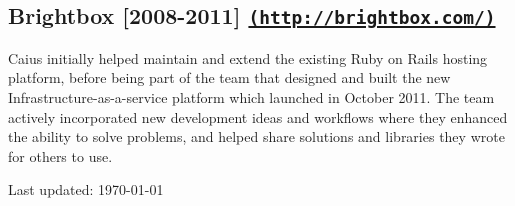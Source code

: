 \documentclass[letterpaper]{article}
\begin{document}

\subsection*{Brightbox [2008-2011] \href{http://brightbox.com/}{\tt (http://brightbox.com/)}} %
\label{sub:brightbox}

Caius initially helped maintain and extend the existing Ruby on Rails hosting platform, before being part of the team that designed and built the new Infrastructure-as-a-service platform which launched in October 2011. The team actively incorporated new development ideas and workflows where they enhanced the ability to solve problems, and helped share solutions and libraries they wrote for others to use.

\bigskip

\begin{center}
  \begin{footnotesize}
    Last updated: \today
  \end{footnotesize}
\end{center}
\end{document}
